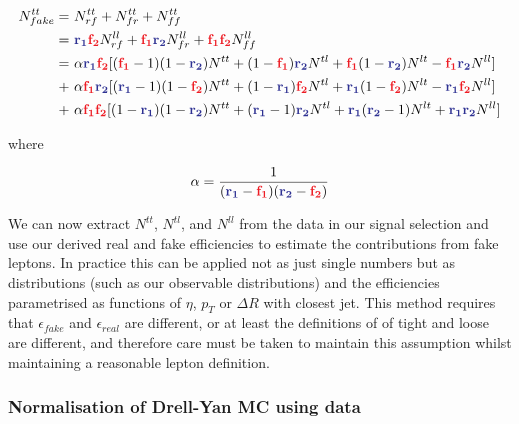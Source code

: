 \begin{align}
N^{tt}_{fake} =&~ N^{tt}_{rf} + N^{tt}_{fr} + N^{tt}_{ff} \\
              =&~ \rone \ftwo N^{ll}_{rf} + \fone \rtwo N^{ll}_{fr} + \fone \ftwo N^{ll}_{ff} \\
              =&~ \alpha \rone \ftwo [(\fone -1)(1-\rtwo )N^{tt} + (1-\fone )\rtwo N^{tl} + \fone (1-\rtwo )N^{lt} - \fone \rtwo N^{ll}] \nonumber \\
               +&~ \alpha \fone \rtwo [(\rone -1)(1-\ftwo )N^{tt} + (1-\rone )\ftwo N^{tl} + \rone (1-\ftwo )N^{lt} - \rone \ftwo N^{ll}] \nonumber \\
               +&~ \alpha \fone \ftwo [(1-\rone )(1-\rtwo )N^{tt} + (\rone - 1)\rtwo N^{tl} + \rone (\rtwo  -1)N^{lt} + \rone \rtwo N^{ll}]
\end{align}

where

\begin{equation*}
\alpha = \frac{1}{(\rone - \fone )(\rtwo -\ftwo )}
\end{equation*}

We can now extract $N^{tt}$, $N^{tl}$, and $N^{ll}$ from the data in our signal selection and use our derived real and fake efficiencies to estimate the contributions from fake leptons. In practice this can be applied not as just single numbers but as distributions (such as our observable distributions) and the efficiencies parametrised as functions of $\eta$, $p_T$ or $\Delta R$ with closest jet. This method requires that $\epsilon_{fake}$ and $\epsilon_{real}$ are different, or at least the definitions of of tight and loose are different, and therefore care must be taken to maintain this assumption whilst maintaining a reasonable lepton definition.

\subsubsection*{Normalisation of Drell-Yan MC using data}
\label{sec:drell_yan}

